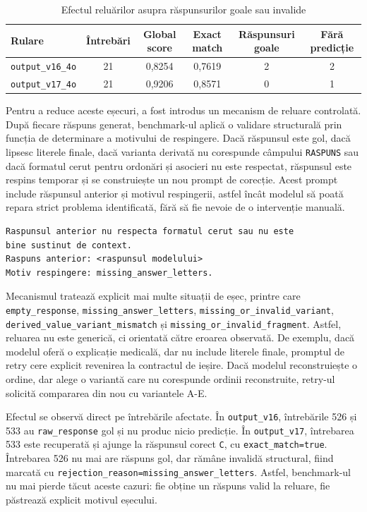 \documentclass[12pt, a4paper, oneside, romanian]{teza-upb}
\begin{document}
\begin{table}[H]
\centering
\label{tab:experiment_retry_v16_v17}
\small
\begin{tabular}{lccccc}
\toprule
\textbf{Rulare} & \textbf{Întrebări} & \textbf{Global score} & \textbf{Exact match} & \textbf{Răspunsuri goale} & \textbf{Fără predicție} \\
\midrule
\texttt{output\_v16\_4o} & 21 & 0,8254 & 0,7619 & 2 & 2 \\
\texttt{output\_v17\_4o} & 21 & 0,9206 & 0,8571 & 0 & 1 \\
\bottomrule
\end{tabular}
\caption{Efectul reluărilor asupra răspunsurilor goale sau invalide}
\end{table}

Pentru a reduce aceste eșecuri, a fost introdus un mecanism de reluare controlată. După fiecare răspuns generat, benchmark-ul aplică o validare structurală prin funcția de determinare a motivului de respingere. Dacă răspunsul este gol, dacă lipsesc literele finale, dacă varianta derivată nu corespunde câmpului \texttt{RASPUNS} sau dacă formatul cerut pentru ordonări și asocieri nu este respectat, răspunsul este respins temporar și se construiește un nou prompt de corecție. Acest prompt include răspunsul anterior și motivul respingerii, astfel încât modelul să poată repara strict problema identificată, fără să fie nevoie de o intervenție manuală.

\begin{lstlisting}[basicstyle=\ttfamily\footnotesize]
Raspunsul anterior nu respecta formatul cerut sau nu este
bine sustinut de context.
Raspuns anterior: <raspunsul modelului>
Motiv respingere: missing_answer_letters.
\end{lstlisting}

Mecanismul tratează explicit mai multe situații de eșec, printre care \texttt{empty\_response}, \texttt{missing\_answer\_letters}, \texttt{missing\_or\_invalid\_variant}, \texttt{derived\_value\_variant\_mismatch} și \texttt{missing\_or\_invalid\_fragment}. Astfel, reluarea nu este generică, ci orientată către eroarea observată. De exemplu, dacă modelul oferă o explicație medicală, dar nu include literele finale, promptul de retry cere explicit revenirea la contractul de ieșire. Dacă modelul reconstruiește o ordine, dar alege o variantă care nu corespunde ordinii reconstruite, retry-ul solicită compararea din nou cu variantele A-E.

Efectul se observă direct pe întrebările afectate. În \texttt{output\_v16}, întrebările 526 și 533 au \texttt{raw\_response} gol și nu produc nicio predicție. În \texttt{output\_v17}, întrebarea 533 este recuperată și ajunge la răspunsul corect \texttt{C}, cu \texttt{exact\_match=true}. Întrebarea 526 nu mai are răspuns gol, dar rămâne invalidă structural, fiind marcată cu \texttt{rejection\_reason=missing\_answer\_letters}. Astfel, benchmark-ul nu mai pierde tăcut aceste cazuri: fie obține un răspuns valid la reluare, fie păstrează explicit motivul eșecului.
\end{document}
